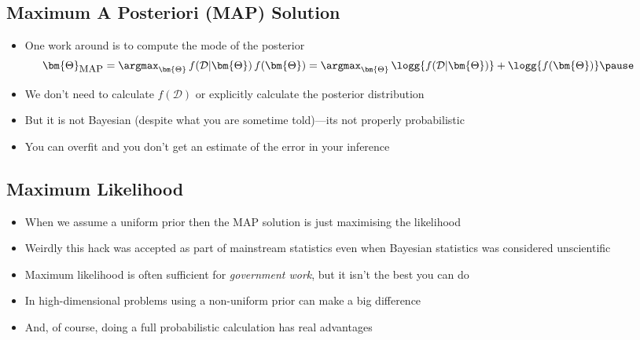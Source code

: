 
\begin{slide}
\section{Maximum A Posteriori (MAP) Solution}

\begin{PauseHighLight}
  \begin{itemize}
  \item One work around is to compute the mode of the posterior
    \begin{align*}
       \hspace{-1cm}\bm{\Theta}_{\text{\small MAP}} =
      \argmax_{\bm{\Theta}} \,
       f(\mathcal{D}|\bm{\Theta})\, f(\bm{\Theta})  =
       \argmax_{\bm{\Theta}} \, \logg{f(\mathcal{D}|\bm{\Theta})} +
       \logg{f(\bm{\Theta})}\pause
    \end{align*}
  \item We don't need to calculate $f(\mathcal{D})$ or explicitly
    calculate the posterior distribution\pause
  \item But it is not Bayesian (despite what you are sometime
    told)\pause---its not properly probabilistic\pauseb
  \item You can overfit and you don't get an estimate of the error in
    your inference\pause
  \end{itemize}
\end{PauseHighLight}

\end{slide}


\begin{slide}
\section{Maximum Likelihood}

\begin{PauseHighLight}
  \begin{itemize}
  \item When we assume a uniform prior then the MAP solution is just
    maximising the likelihood\pause
  \item Weirdly this hack was accepted as part of mainstream
    statistics even when Bayesian statistics was considered
    unscientific\pause
  \item Maximum likelihood is often sufficient for \textit{government
      work}, but it isn't the best you can do\pause
  \item In high-dimensional problems using a non-uniform prior
    can make a big difference\pause
  \item And, of course, doing a full probabilistic calculation has real
    advantages\pause
  \end{itemize}
\end{PauseHighLight}

\end{slide}



